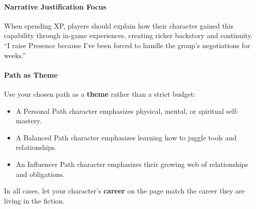 \paragraph{Narrative Justification Focus}
\label{sec:xp-narrative-justification}
When spending XP, players should explain how their character gained this
capability through in-game experiences, creating richer backstory and
continuity. ``I raise Presence because I've been forced to handle the group's
negotiations for weeks.''

\paragraph{Path as Theme}
\label{sec:xp-path-theme}
Use your chosen path as a \textbf{theme} rather than a strict budget:
\begin{itemize}
  \item A Personal Path character emphasizes physical, mental, or spiritual self-mastery.
  \item A Balanced Path character emphasizes learning how to juggle tools and relationships.
  \item An Influencer Path character emphasizes their growing web of relationships and obligations.
\end{itemize}

In all cases, let your character's \textbf{career} on the page match the career
they are living in the fiction.